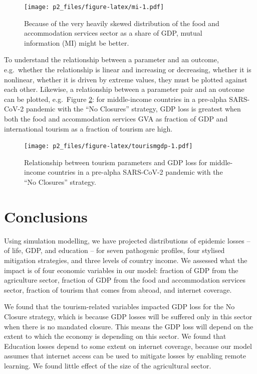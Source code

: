 \documentclass[
]{article}
\begin{document}
\begin{figure}
\centering
\texttt{[image: p2\_files/figure-latex/mi-1.pdf]}
\caption{\label{fig:mi}Because of the very heavily skewed distribution of the food and accommodation services sector as a share of GDP, mutual information (MI) might be better.}
\end{figure}

\newpage

To understand the relationship between a parameter and an outcome, e.g.~whether the relationship is linear and increasing or decreasing, whether it is nonlinear, whether it is driven by extreme values, they must be plotted against each other. Likewise, a relationship between a parameter pair and an outcome can be plotted, e.g.~Figure \ref{fig:tourismgdp}: for middle-income countries in a pre-alpha SARS-CoV-2 pandemic with the ``No Closures'' strategy, GDP loss is greatest when both the food and accommodation services GVA as fraction of GDP and international tourism as a fraction of tourism are high.

\begin{figure}
\centering
\texttt{[image: p2\_files/figure-latex/tourismgdp-1.pdf]}
\caption{\label{fig:tourismgdp}Relationship between tourism parameters and GDP loss for middle-income countries in a pre-alpha SARS-CoV-2 pandemic with the ``No Closures'' strategy.}
\end{figure}

\newpage

\hypertarget{conclusions}{%
\section{Conclusions}\label{conclusions}}

Using simulation modelling, we have projected distributions of epidemic losses -- of life, GDP, and education -- for seven pathogenic profiles, four stylised mitigation strategies, and three levels of country income. We assessed what the impact is of four economic variables in our model: fraction of GDP from the agriculture sector, fraction of GDP from the food and accommodation services sector, fraction of tourism that comes from abroad, and internet coverage.

We found that the tourism-related variables impacted GDP loss for the No Closure strategy, which is because GDP losses will be suffered only in this sector when there is no mandated closure. This means the GDP loss will depend on the extent to which the economy is depending on this sector. We found that Education losses depend to some extent on internet coverage, because our model assumes that internet access can be used to mitigate losses by enabling remote learning. We found little effect of the size of the agricultural sector.
\end{document}
